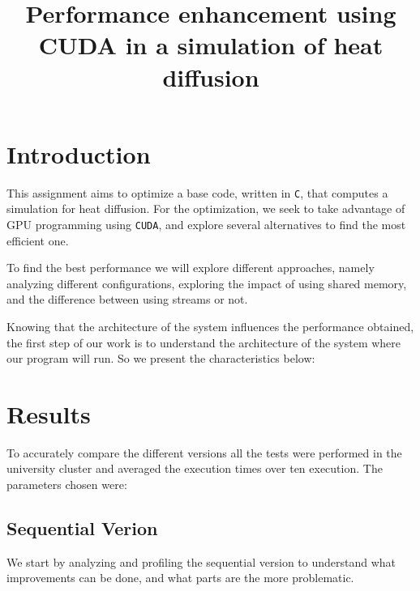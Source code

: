 \documentclass[conference]{IEEEtran}
\begin{document}
\title{Performance enhancement using CUDA in a simulation of heat diffusion}

\author{
  \and
}

\maketitle



\section{Introduction}
This assignment aims to optimize a base code, written in \texttt{C}, that computes a simulation for heat diffusion. For the optimization, we seek to take advantage of GPU programming using \texttt{CUDA}, and explore several alternatives to find the most efficient one.

To find the best performance we will explore different approaches, namely analyzing different configurations, exploring the impact of using shared memory, and the difference between using streams or not.

Knowing that the architecture of the system influences the performance obtained, the first step of our work is to understand the architecture of the system where our program will run. So we present the characteristics below:


\section{Results}
To accurately compare the different versions all the tests were performed in the university cluster and averaged the execution times over ten execution. The parameters chosen were:



\subsection{Sequential Verion}
We start by analyzing and profiling the sequential version to understand what improvements can be done, and what parts are the more problematic.
\end{document}
